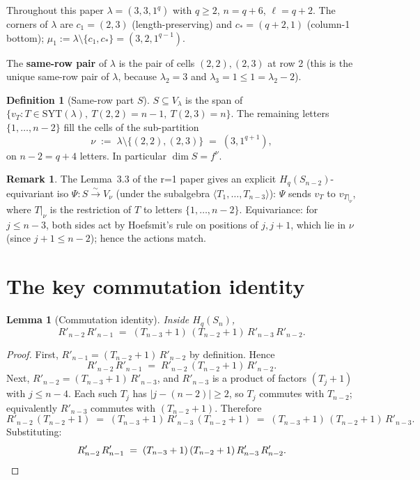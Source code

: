 \documentclass[11pt]{article}
\newtheorem{lemma}[theorem]{Lemma}
\theoremstyle{definition}
\newtheorem{definition}[theorem]{Definition}
\newtheorem{remark}[theorem]{Remark}
\begin{document}
Throughout this paper $\lambda = (3, 3, 1^q)$ with $q \ge 2$,
$n = q + 6$, $\ell = q + 2$. The corners of $\lambda$ are
$c_1 = (2, 3)$ (length-preserving) and $c_* = (q+2, 1)$ (column-1
bottom); $\mu_1 := \lambda \setminus \{c_1, c_*\} = (3, 2, 1^{q-1})$.

The {\bf same-row pair} of $\lambda$ is the pair of cells
$(2, 2), (2, 3)$ at row 2 (this is the unique same-row pair of
$\lambda$, because $\lambda_2 = 3$ and $\lambda_3 = 1 \le 1 = \lambda_2 - 2$).

\begin{definition}[Same-row part $S$]\label{def:S}
$S \subseteq V_\lambda$ is the span of $\{v_T : T \in \mathrm{SYT}(\lambda),
\ T(2, 2) = n-1,\ T(2, 3) = n\}$. The remaining letters
$\{1, \ldots, n-2\}$ fill the cells of the sub-partition
\[
   \nu \;:=\; \lambda \setminus \{(2, 2), (2, 3)\}
        \;=\; (3, 1^{q+1}),
\]
on $n - 2 = q + 4$ letters. In particular $\dim S = f^\nu$.
\end{definition}

\begin{remark}
The Lemma~3.3 of the r=1 paper gives an explicit
$H_q(S_{n-2})$-equivariant iso $\Psi : S \xrightarrow{\sim} V_\nu$
(under the subalgebra $\langle T_1, \ldots, T_{n-3}\rangle$): $\Psi$
sends $v_T$ to $v_{T|_\nu}$, where $T|_\nu$ is the restriction of $T$
to letters $\{1, \ldots, n-2\}$. Equivariance: for $j \le n-3$, both
sides act by Hoefsmit's rule on positions of $j, j+1$, which lie in
$\nu$ (since $j+1 \le n-2$); hence the actions match.
\end{remark}

\section{The key commutation identity}\label{sec:commute}

\begin{lemma}[Commutation identity]\label{lem:commute}
Inside $H_q(S_n)$,
\begin{equation}\label{eq:commute}
   R'_{n-2}\, R'_{n-1}
   \;=\; (T_{n-3}+1)\,(T_{n-2}+1)\, R'_{n-3}\, R'_{n-2}.
\end{equation}
\end{lemma}

\begin{proof}
First, $R'_{n-1} = (T_{n-2}+1)\, R'_{n-2}$ by definition. Hence
\[
   R'_{n-2}\, R'_{n-1} \;=\; R'_{n-2}\,(T_{n-2}+1)\, R'_{n-2}.
\]
Next, $R'_{n-2} = (T_{n-3}+1)\, R'_{n-3}$, and $R'_{n-3}$ is a product of
factors $(T_j+1)$ with $j \le n - 4$. Each such $T_j$ has $|j - (n-2)| \ge 2$,
so $T_j$ commutes with $T_{n-2}$; equivalently $R'_{n-3}$ commutes with
$(T_{n-2}+1)$. Therefore
\[
   R'_{n-2}\,(T_{n-2}+1)
   \;=\; (T_{n-3}+1)\, R'_{n-3}\,(T_{n-2}+1)
   \;=\; (T_{n-3}+1)\,(T_{n-2}+1)\, R'_{n-3}.
\]
Substituting:
\[
   R'_{n-2}\, R'_{n-1}
   \;=\; (T_{n-3}+1)\,(T_{n-2}+1)\, R'_{n-3}\, R'_{n-2}. \qedhere
\]
\end{proof}
\end{document}
